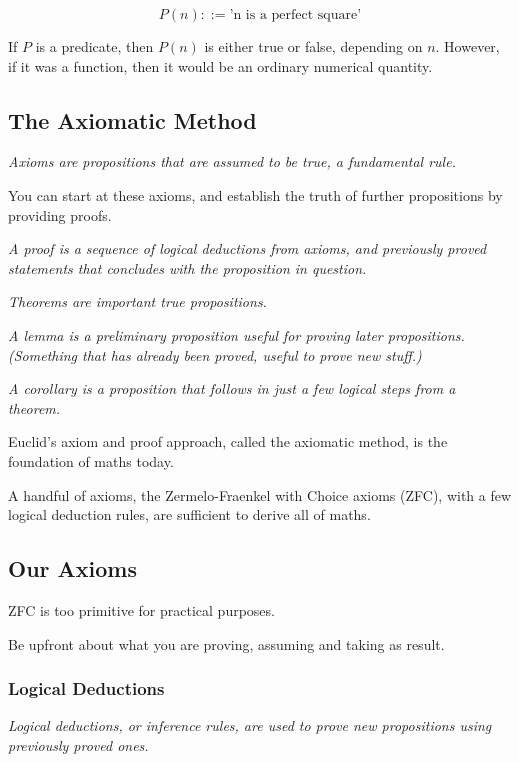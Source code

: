 \[P(n) ::= \text{'n is a perfect square'}\]

If \(P\) is a predicate, then \(P(n)\) is either true or false, depending on \(n\). However, if it was a function, then it would be an ordinary numerical quantity.

\subsection{The Axiomatic Method}

\emph{Axioms are propositions that are assumed to be true, a fundamental rule.}

You can start at these axioms, and establish the truth of further propositions by providing proofs. 

\vspace{1mm}

\emph{A proof is a sequence of logical deductions from axioms, and previously proved statements that concludes with the proposition in question.}

\emph{Theorems are important true propositions.}

\emph{A lemma is a preliminary proposition useful for proving later propositions. (Something that has already been proved, useful to prove new stuff.)}

\emph{A corollary is a proposition that follows in just a few logical steps from a theorem.}

\vspace{1mm}

Euclid's axiom and proof approach, called the axiomatic method, is the foundation of maths today.

A handful of axioms, the Zermelo-Fraenkel with Choice axioms (ZFC), with a few logical deduction rules, are sufficient to derive all of maths.

\subsection{Our Axioms}

ZFC is too primitive for practical purposes.

Be upfront about what you are proving, assuming and taking as result.

\subsubsection{Logical Deductions}

\emph{Logical deductions, or inference rules, are used to prove new propositions using previously proved ones.}


